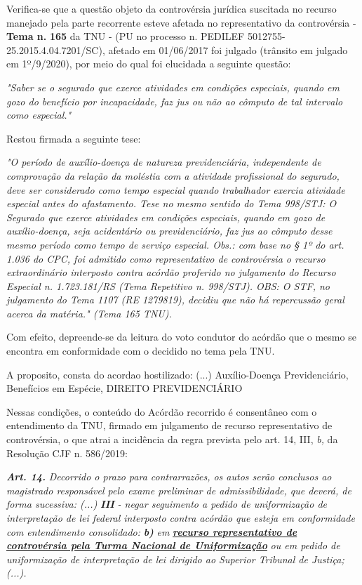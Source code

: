 \documentclass[12pt]{article}
\begin{document}
\justifying
\noindent Verifica-se que a questão objeto da controvérsia jurídica suscitada no recurso manejado pela parte recorrente esteve afetada no representativo da controvérsia - \textbf{Tema n. }\textbf{165} da TNU - (PU no processo n. PEDILEF 5012755-25.2015.4.04.7201/SC),  afetado em 01/06/2017 foi julgado (trânsito em julgado em 1º/9/2020), por meio do qual foi elucidada a seguinte questão:

\noindent \textit{"Saber se o segurado que exerce atividades em condições especiais, quando em gozo do benefício por incapacidade, faz jus ou não ao cômputo de tal intervalo como especial."}

\noindent Restou firmada a seguinte tese:

\noindent \textit{"O período de auxílio-doença de natureza previdenciária, independente de comprovação da relação da moléstia com a atividade profissional do segurado, deve ser considerado como tempo especial quando trabalhador exercia atividade especial antes do afastamento. Tese no mesmo sentido do Tema 998/STJ: O Segurado que exerce atividades em condições especiais, quando em gozo de auxílio-doença, seja acidentário ou previdenciário, faz jus ao cômputo desse mesmo período como tempo de serviço especial. Obs.: com base no § 1º do art. 1.036 do CPC, foi admitido como representativo de controvérsia o recurso extraordinário interposto contra acórdão proferido no julgamento do Recurso Especial n. 1.723.181/RS (Tema Repetitivo n. 998/STJ). OBS: O STF, no julgamento do Tema 1107 (RE 1279819), decidiu que não há repercussão geral acerca da matéria." (Tema 165 TNU).}

\noindent Com efeito, depreende-se da leitura do voto condutor do acórdão que o mesmo se encontra em conformidade com o decidido no  tema pela TNU.

\noindent A proposito, consta do acordao hostilizado: (...) Auxílio-Doença Previdenciário, Benefícios em Espécie, DIREITO PREVIDENCIÁRIO

\noindent Nessas condições, o conteúdo do Acórdão recorrido é consentâneo com o entendimento da TNU, firmado em julgamento de recurso representativo de controvérsia, o que atrai a incidência da regra prevista pelo art. 14, III, \textit{b,} da Resolução CJF n. 586/2019:

\noindent \textit{\textbf{Art. 14.}}\textit{ Decorrido o prazo para contrarrazões, os autos serão conclusos ao magistrado responsável pelo exame preliminar de admissibilidade, que deverá, de forma sucessiva: (...) }\textit{\textbf{III }}\textit{- negar seguimento a pedido de uniformização de interpretação de lei federal interposto contra acórdão que esteja em conformidade com entendimento consolidado: }\textit{\textbf{b)}}\textit{ em }\uline{\textit{\textbf{recurso representativo de controvérsia pela Turma Nacional de Uniformização}}}\textit{ ou em pedido de uniformização de interpretação de lei dirigido ao Superior Tribunal de Justiça;(...).}
\end{document}
